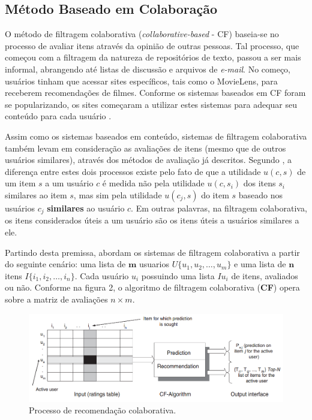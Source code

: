 \documentclass[12pt, openright, oneside, a4paper, brazil]{abntex2}
\begin{document}
\subsection{Método Baseado em Colaboração}

O método de filtragem colaborativa (\textit{collaborative-based} - CF) baseia-se no processo de avaliar itens através da opinião de outras pessoas. Tal processo, que começou com a filtragem da natureza de repositórios de texto, passou a ser mais informal, abrangendo até listas de discussão e arquivos de \textit{e-mail}. No começo, usuários tinham que acessar sites específicos, tais como o MovieLens, para receberem recomendações de filmes. Conforme os sistemas baseados em CF foram se popularizando, os sites começaram a utilizar estes sistemas para adequar seu conteúdo para cada usuário \cite{schafer2007collaborative}.

Assim como os sistemas baseados em conteúdo, sistemas de filtragem colaborativa também levam em consideração as avaliações de itens (mesmo que de outros usuários similares), através dos métodos de avaliação já descritos. Segundo , a diferença entre estes dois processos existe pelo fato de que a utilidade $u(c,s)$ de um item $s$ a um usuário $c$ é medida não pela utilidade $u(c,s_{i})$ dos itens $s_{i}$ similares ao item $s$, mas sim pela utilidade $u(c_{j}, s)$ do item $s$ baseado nos usuários $c_{j}$ \textbf{similares} ao usuário $c$. Em outras palavras, na filtragem colaborativa, os itens considerados úteis a um usuário são os itens úteis a usuários similares a ele.

Partindo desta premissa,  abordam os sistemas de filtragem colaborativa a partir do seguinte cenário: uma lista de $\textbf{m}$ usuarios $U \lbrace u_{1}, u_{2}, …, u_{m} \rbrace$ e uma lista de $\textbf{n}$ itens $I \lbrace i_{1}, i_{2}, …, i_{n} \rbrace$. Cada usuário $u_{i}$ possuindo uma lista $Iu_{i}$ de itens, avaliados ou não. Conforme na figura 2, o algoritmo de filtragem colaborativa (\textbf{CF}) opera sobre a matriz de avaliações $n \times m$.

\begin{figure}[htb]
	\caption{\label{collaborative_based}Processo de recomendação colaborativa.}

	\begin{center}
		\includegraphics[scale=0.6]{images/collaborative_based.png}
	\end{center}
\end{figure}
\end{document}
